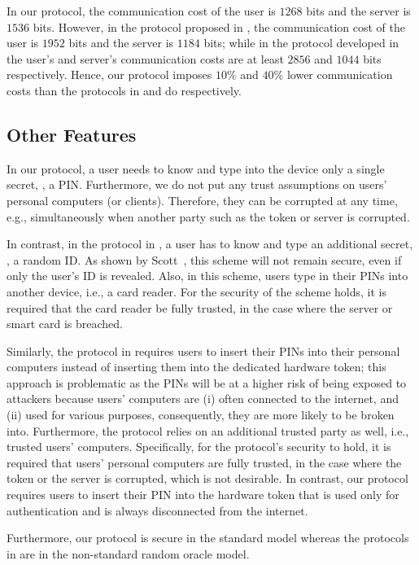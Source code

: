 In our protocol, the communication cost of the user is $1268$ bits and the server is $1536$ bits. However, in the protocol proposed in \cite{WangW18},  the communication cost of the user is $1952$ bits and the server is  $1184$ bits; while in the protocol developed in \cite{JareckiJKSS21} the user's and server's communication costs are at least $2856$ and $1044$ bits respectively. Hence, our protocol imposes $10\%$ and $40\%$ lower communication costs than the protocols in \cite{WangW18} and \cite{JareckiJKSS21} do respectively.


\subsection{Other Features}
 In our protocol, a user needs to know and type into the device only a single secret, \ie, a PIN. Furthermore, we do not put any trust assumptions on users' personal computers (or clients). Therefore, they can be corrupted at any time, e.g., simultaneously when another party such as the token or server is corrupted. 
 
 In contrast, in the protocol in \cite{WangW18}, a user has to know and type an additional secret, \ie, a random ID. As shown by Scott~\cite{Scott12a}, this scheme will not remain secure, even if only the user's ID is revealed. Also, in this scheme, users type in their PINs into another device, i.e., a card reader. For the security of the scheme holds, it is required that the card reader be fully trusted, in the case where the server or smart card is breached. 
 
  
   Similarly, the protocol in \cite{JareckiJKSS21} requires users to insert their PINs into their personal computers instead of inserting them into the dedicated hardware token; this approach is problematic as the PINs will be at a higher risk of being exposed to attackers because users' computers are (i) often connected to the internet, and (ii) used for various purposes, consequently, they are more likely to be broken into. Furthermore, the protocol relies on an additional trusted party as well, i.e., trusted users' computers. Specifically, for the protocol's security to hold, it is required that users' personal computers are fully trusted, in the case where the token or the server is corrupted, which is not desirable. In contrast, our protocol requires users to insert their PIN into the hardware token that is used only for authentication and is always disconnected from the internet. 
 
 Furthermore, our protocol is secure in the standard model whereas the protocols in \cite{WangW18,JareckiJKSS21} are in the non-standard random oracle model. 

